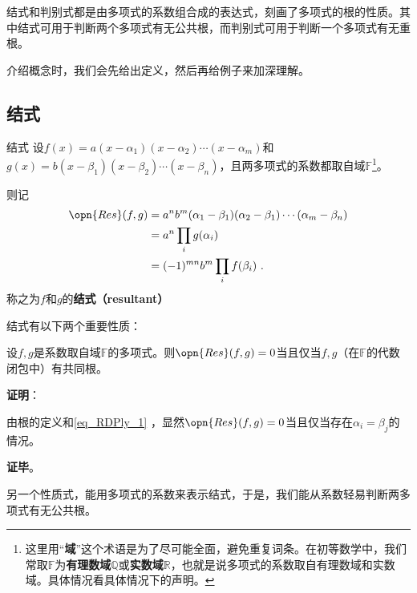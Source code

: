 

结式和判别式都是由多项式的系数组合成的表达式，刻画了多项式的根的性质。其中结式可用于判断两个多项式有无公共根，而判别式可用于判断一个多项式有无重根。

介绍概念时，我们会先给出定义，然后再给例子来加深理解。

\subsection{结式}

\begin{definition}{结式}
设$f(x)=a(x-\alpha_1)(x-\alpha_2)\cdots(x-\alpha_m)$和$g(x)=b(x-\beta_1)(x-\beta_2)\cdots(x-\beta_n)$，且两多项式的系数都取自域$\mathbb{F}$\footnote{这里用“\textbf{域}”这个术语是为了尽可能全面，避免重复词条。在初等数学中，我们常取$\mathbb{F}$为\textbf{有理数域}$\mathbb{Q}$或\textbf{实数域}$\mathbb{R}$，也就是说多项式的系数取自有理数域和实数域。具体情况看具体情况下的声明。}。

则记
\begin{equation}\label{eq_RDPly_1}
\begin{aligned}
\opn{Res}(f, g)&=a^nb^m(\alpha_1-\beta_1)(\alpha_2-\beta_1)\cdots(\alpha_m-\beta_n)\\
&=a^n\prod_{i} g(\alpha_i)\\
&=(-1)^{mn}b^m\prod_{i} f(\beta_i)~.
\end{aligned}
\end{equation}
称之为$f$和$g$的\textbf{结式（resultant）}

\end{definition}

结式有以下两个重要性质：

\begin{theorem}{}
设$f, g$是系数取自域$\mathbb{F}$的多项式。则$\opn{Res}(f, g)=0$当且仅当$f, g$（在$\mathbb{F}$的代数闭包中）有共同根。
\end{theorem}

\textbf{证明}：

由根的定义和\autoref{eq_RDPly_1} ，显然$\opn{Res}(f, g)=0$当且仅当存在$\alpha_i=\beta_j$的情况。

\textbf{证毕}。


另一个性质式，能用多项式的系数来表示结式，于是，我们能从系数轻易判断两多项式有无公共根。



